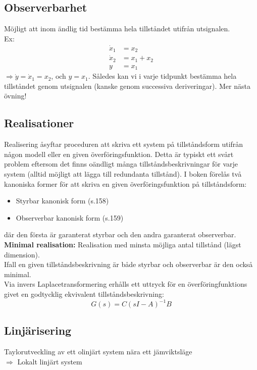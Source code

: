 \documentclass[12pt]{article}
\begin{document}
\subsection*{Observerbarhet}
Möjligt att inom ändlig tid bestämma hela tillståndet utifrån utsignalen. \\
Ex: \\
\begin{align*}
  \dot{x}_1 &= x_2 \\
  \dot{x}_2 &= x_1 + x_2 \\
  y &= x_1
\end{align*}
$\Rightarrow \dot{y} = \dot{x}_1 = x_2$, och $y = x_1$. Således kan vi i varje tidpunkt bestämma hela tillståndet genom utsignalen (kanske genom successiva deriveringar). Mer nästa övning!

\subsection*{Realisationer}
Realisering åsyftar proceduren att skriva ett system på tillståndsform utifrån någon modell eller en given överföringsfunktion. Detta är typiskt ett svårt problem eftersom det finns oändligt många tillståndsbeskrivningar för varje system (alltid möjligt att lägga till redundanta tillstånd). I boken förelås två kanoniska former för att skriva en given överföringsfunktion på tillståndsform:
\begin{itemize}
\item Styrbar kanonisk form (s.158)
\item  Observerbar kanonisk form (s.159)
\end{itemize}
där den första är garanterat styrbar och den andra garanterat observerbar.\\

\textbf{Minimal realisation:} Realisation med minsta möjliga antal tillstånd (lägst dimension). \\

Ifall en given tillståndsbeskrivning är både styrbar och observerbar är den också minimal. \\

Via invers Laplacetransformering erhålls ett uttryck för en överföringfunktions givet en godtycklig ekvivalent tillståndsbeskrivning:
\begin{equation*}
  G(s) = C(sI-A)^{-1}B
\end{equation*}

\subsection*{Linjärisering}
Taylorutveckling av ett olinjärt system nära ett jämviktsläge \\
$\Rightarrow$ Lokalt linjärt system
\end{document}
